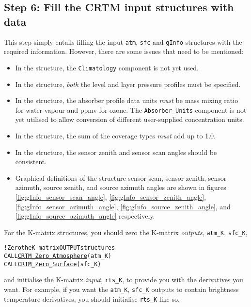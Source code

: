 \subsection{Step 6: Fill the CRTM input structures with data}
This step simply entails filling the input \texttt{atm}, \texttt{sfc} and \texttt{gInfo} structures with the required information. However, there are some issues that need to be mentioned:
\begin{itemize}
  \item In the \hyperref[sec:atmosphere_structure]{\Atmosphere} structure, the \texttt{Climatology} component is not yet used.
  \item In the \hyperref[sec:atmosphere_structure]{\Atmosphere} structure, \emph{both} the level and layer pressure profiles must be specified.
  \item In the \hyperref[sec:atmosphere_structure]{\Atmosphere} structure, the absorber profile data units \emph{must} be mass mixing ratio for water vapour and ppmv for ozone. The \texttt{Absorber\_Units} component is not yet utilised to allow conversion of different user-supplied concentration units.
  \item In the \hyperref[sec:surface_structure]{\Surface} structure, the sum of the coverage types \emph{must} add up to 1.0.
  \item In the \hyperref[sec:geometryinfo_structure]{\GeometryInfo} structure, the sensor zenith and sensor scan angles should be consistent.
  \item Graphical definitions of the \hyperref[sec:geometryinfo_structure]{\GeometryInfo} structure sensor scan, sensor zenith, sensor azimuth, source zenith, and source azimuth angles are shown in figures \ref{fig:gInfo_sensor_scan_angle}, \ref{fig:gInfo_sensor_zenith_angle}, \ref{fig:gInfo_sensor_azimuth_angle}, \ref{fig:gInfo_source_zenith_angle}, and  \ref{fig:gInfo_source_azimuth_angle} respectively.
\end{itemize}
For the K-matrix structures, you should zero the K-matrix \emph{outputs}, \texttt{atm\_K}, \texttt{sfc\_K},
\begin{alltt}
  ! Zero the K-matrix OUTPUT structures
  CALL \hyperref[sec:CRTM_Zero_Atmosphere_interface]{CRTM_Zero_Atmosphere}( atm_K )
  CALL \hyperref[sec:CRTM_Zero_Surface_interface]{CRTM_Zero_Surface}( sfc_K )\end{alltt}
and initialise the K-matrix \emph{input}, \texttt{rts\_K}, to provide you with the derivatives you want. For example, if you want the \texttt{atm\_K}, \texttt{sfc\_K} outputs to contain brightness temperature derivatives, you should initialise \texttt{rts\_K} like so,
